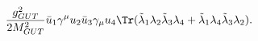 \begin{equation}\label{secondamp}
{g_{GUT}^2\over 2M_{GUT}^2} \bar u_1 \gamma^\mu u_2 \bar u_3 \gamma_\mu u_4
\Tr(\tilde \lambda_1
\lambda_2\tilde\lambda_3\lambda_4+\tilde\lambda_1\lambda_4\tilde\lambda_3\lambda_2).
\end{equation}

